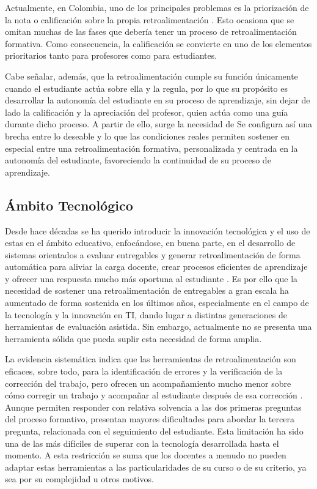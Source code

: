 \documentclass[letterpaper, 10 pt, conference]{ieeeconf}  %
\begin{document}
    Actualmente, en Colombia, uno de los principales problemas es la priorización de la nota o calificación sobre la propia retroalimentación \cite{10}. Esto ocasiona que se omitan muchas de las fases que debería tener un proceso de retroalimentación formativa. Como consecuencia, la calificación se convierte en uno de los elementos prioritarios tanto para profesores como para estudiantes.

    Cabe señalar, además, que la retroalimentación cumple su función únicamente cuando el estudiante actúa sobre ella y la regula, por lo que su propósito es desarrollar la autonomía del estudiante en su proceso de aprendizaje\cite{11}, sin dejar de lado la calificación y la apreciación del profesor, quien actúa como una guía durante dicho proceso. A partir de ello, surge la necesidad de Se configura así una brecha entre lo deseable y lo que las condiciones reales permiten sostener en especial entre una retroalimentación formativa, personalizada y centrada en la autonomía del estudiante, favoreciendo la continuidad de su proceso de aprendizaje. 
    
     
    \subsection{Ámbito Tecnológico} 
    Desde hace décadas se ha querido introducir la innovación tecnológica y el uso de estas en el ámbito educativo, enfocándose, en buena parte, en el desarrollo de sistemas orientados a evaluar entregables y generar retroalimentación de forma automática para aliviar la carga docente, crear procesos eficientes de aprendizaje y ofrecer una respuesta mucho más oportuna al estudiante \cite{13}. Es por ello que la necesidad de sostener una retroalimentación de entregables a gran escala ha aumentado de forma sostenida en los últimos años, especialmente en el campo de la tecnología y la innovación en TI, dando lugar a distintas generaciones de herramientas de evaluación asistida. Sin embargo, actualmente no se presenta una herramienta sólida que pueda suplir esta necesidad de forma amplia.

    La evidencia sistemática indica que las herramientas de retroalimentación son eficaces, sobre todo, para la identificación de errores y la verificación de la corrección del trabajo, pero ofrecen un acompañamiento mucho menor sobre cómo corregir un trabajo y acompañar al estudiante después de esa corrección \cite{14}. Aunque permiten responder con relativa solvencia a las dos primeras preguntas del proceso formativo, presentan mayores dificultades para abordar la tercera pregunta, relacionada con el seguimiento del estudiante. Esta limitación ha sido una de las más difíciles de superar con la tecnología desarrollada hasta el momento. A esta restricción se suma que los docentes a menudo no pueden adaptar estas herramientas a las particularidades de su curso o de su criterio, ya sea por su complejidad u otros motivos.
\end{document}
